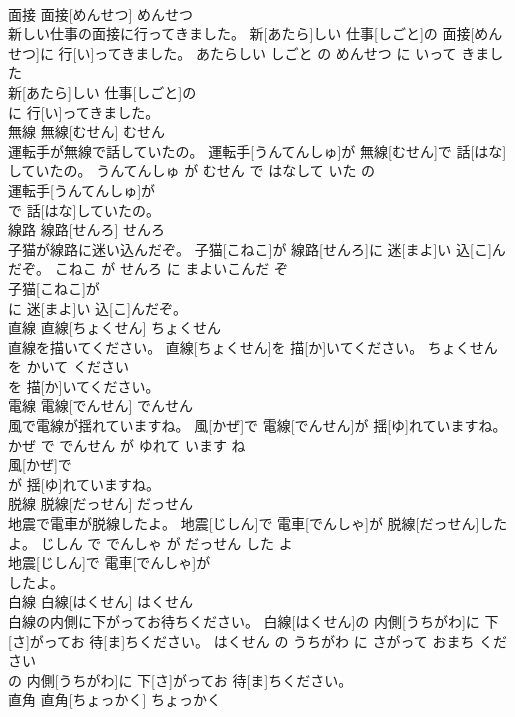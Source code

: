 \documentclass[8pt]{extreport}
\begin{document}
\begin{CJK}{UTF8}{min}
\\	面接	面接[めんせつ]	めんせつ	
\\	新しい仕事の面接に行ってきました。	新[あたら]しい 仕事[しごと]の 面接[めんせつ]に 行[い]ってきました。	あたらしい しごと の めんせつ に いって きました	
\\	新[あたら]しい 仕事[しごと]の
\\	に 行[い]ってきました。			
\\	無線	無線[むせん]	むせん	
\\	運転手が無線で話していたの。	運転手[うんてんしゅ]が 無線[むせん]で 話[はな]していたの。	うんてんしゅ が むせん で はなして いた の	
\\	運転手[うんてんしゅ]が
\\	で 話[はな]していたの。			
\\	線路	線路[せんろ]	せんろ	
\\	子猫が線路に迷い込んだぞ。	子猫[こねこ]が 線路[せんろ]に 迷[まよ]い 込[こ]んだぞ。	こねこ が せんろ に まよいこんだ ぞ	
\\	子猫[こねこ]が
\\	に 迷[まよ]い 込[こ]んだぞ。			
\\	直線	直線[ちょくせん]	ちょくせん	
\\	直線を描いてください。	直線[ちょくせん]を 描[か]いてください。	ちょくせん を かいて ください	
\\	を 描[か]いてください。			
\\	電線	電線[でんせん]	でんせん	
\\	風で電線が揺れていますね。	風[かぜ]で 電線[でんせん]が 揺[ゆ]れていますね。	かぜ で でんせん が ゆれて います ね	
\\	風[かぜ]で
\\	が 揺[ゆ]れていますね。			
\\	脱線	脱線[だっせん]	だっせん	
\\	地震で電車が脱線したよ。	地震[じしん]で 電車[でんしゃ]が 脱線[だっせん]したよ。	じしん で でんしゃ が だっせん した よ	
\\	地震[じしん]で 電車[でんしゃ]が
\\	したよ。			
\\	白線	白線[はくせん]	はくせん	
\\	白線の内側に下がってお待ちください。	白線[はくせん]の 内側[うちがわ]に 下[さ]がってお 待[ま]ちください。	はくせん の うちがわ に さがって おまち ください	
\\	の 内側[うちがわ]に 下[さ]がってお 待[ま]ちください。			
\\	直角	直角[ちょっかく]	ちょっかく	

\end{CJK}
\end{document}
